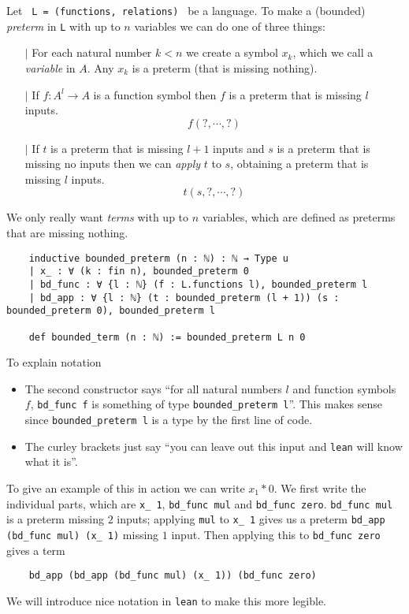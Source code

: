 \begin{dfn}[Terms]
  Let \texttt{ L = (functions, relations) } be a language.
  To make a (bounded) \textit{preterm} in \texttt{L} with up to $n$ variables
  we can do one of three things:
  \begin{itemize}
    \item[$\vert$] For each natural number $k < n$ we create a symbol
          $x_{k}$, which we call a \textit{variable} in $A$.
          Any $x_{k}$ is a preterm (that is missing nothing).
    \item[$\vert$] If $f : A^{l} \to A$ is a function symbol then
          $f$ is a preterm that is missing $l$ inputs.
          \[ f( ? , \cdots , ? )\]
    \item[$\vert$] If $t$ is a preterm that is missing
          $l + 1$ inputs and $s$ is a preterm that is missing
          no inputs then we can \textit{apply} $t$ to $s$, obtaining
          a preterm that is missing $l$ inputs.
          \[ t(s , ? , \cdots, ? )\]
  \end{itemize}

  We only really want \textit{terms} with up to $n$ variables,
  which are defined as preterms that are missing nothing.

  \begin{lstlisting}
    inductive bounded_preterm (n : ℕ) : ℕ → Type u
    | x_ : ∀ (k : fin n), bounded_preterm 0
    | bd_func : ∀ {l : ℕ} (f : L.functions l), bounded_preterm l
    | bd_app : ∀ {l : ℕ} (t : bounded_preterm (l + 1)) (s : bounded_preterm 0), bounded_preterm l

    def bounded_term (n : ℕ) := bounded_preterm L n 0\end{lstlisting}

  To explain notation
  \begin{itemize}
    \item The second constructor says ``for all natural numbers $l$ and function symbols $f$,
          \texttt{bd\_func f} is something of type \texttt{bounded\_preterm l}''.
          This makes sense since \texttt{bounded\_preterm l} is a type by the first line of code.
    \item The curley brackets just say
          ``you can leave out this input and \texttt{lean} will know what it is''.
  \end{itemize}

  To give an example of this in action we can write $x_{1} * 0$.
  We first write the individual parts, which are
  \texttt{x\_ 1}, \texttt{bd\_func mul} and
  \texttt{bd\_func zero}.
  \texttt{bd\_func mul} is a preterm missing $2$ inputs;
  applying \texttt{mul} to \texttt{x\_ 1} gives us a preterm \texttt{bd\_app (bd\_func mul) (x\_ 1)}
  missing $1$ input.
  Then applying this to \texttt{bd\_func zero} gives a term
  \begin{lstlisting}
    bd_app (bd_app (bd_func mul) (x_ 1)) (bd_func zero) \end{lstlisting}
  We will introduce nice notation in \texttt{lean} to make this more legible.
\end{dfn}

